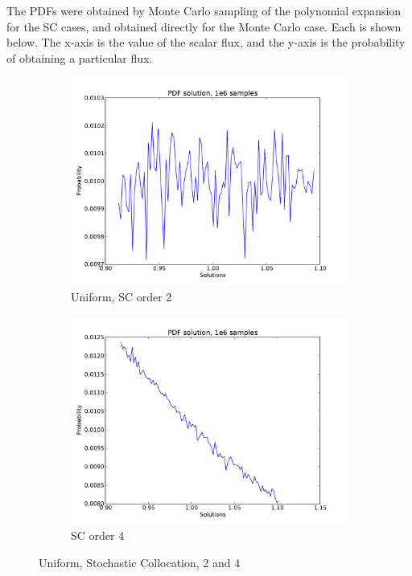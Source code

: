 \documentclass[11pt]{article} %
\begin{document}
The PDFs were obtained by Monte Carlo sampling of the polynomial expansion for the SC cases, and obtained directly for the Monte Carlo case.  Each is shown below.  The x-axis is the value of the scalar flux, and the y-axis is the probability of obtaining a particular flux.
\begin{figure}[h!]
\centering
  \begin{subfigure}[b]{0.45 \textwidth}
   \includegraphics[width=\textwidth]{1d_sc_2_u}
   \caption{Uniform, SC order 2}
   \label{sc2}
  \end{subfigure}
  \begin{subfigure}[b]{0.45\textwidth}
   \includegraphics[width=\textwidth]{1d_sc_4_u}
   \caption{SC order 4}
   \label{Uniform, sc4}
  \end{subfigure}
\caption{Uniform, Stochastic Collocation, 2 and 4}
\end{figure}
\end{document}
